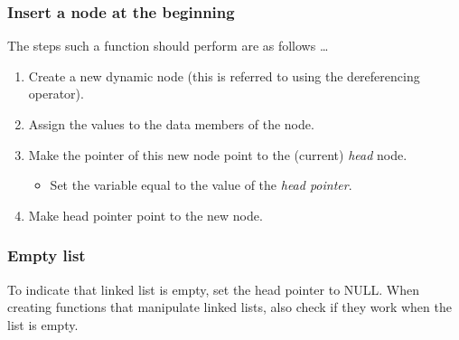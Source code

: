 \subsubsection*{Insert a node at the beginning}
\noindent
The steps such a function should perform are as follows \ldots
\begin{enumerate}
	\item Create a new dynamic node (this is referred to using the dereferencing operator).
	\item Assign the values to the data members of the node.
	\item Make the pointer of this new node point to the (current) \emph{head} node.
	\begin{itemize}
		\item Set the variable equal to the value of the \emph{head pointer}.
	\end{itemize}
	\item Make head pointer point to the new node.
\end{enumerate}


\subsubsection*{Empty list}
To indicate that linked list is empty, set the head pointer to NULL. When creating
functions that manipulate linked lists, also check if they work when the list is empty.



